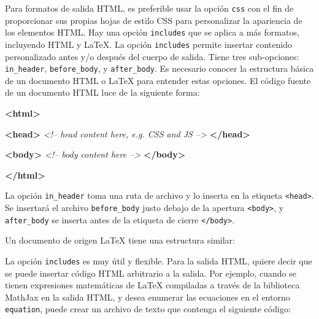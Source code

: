 \documentclass[12pt,]{krantz}
\makeatletter
\newenvironment{Shaded}{\begin{snugshade}}{\end{snugshade}}
\newcommand{\KeywordTok}[1]{\textcolor[rgb]{0.13,0.29,0.53}{\textbf{{#1}}}}
\newcommand{\CommentTok}[1]{\textcolor[rgb]{0.56,0.35,0.01}{\textit{{#1}}}}
\newcommand{\NormalTok}[1]{{#1}}
\newenvironment{kframe}{%
\medskip{}
\setlength{\fboxsep}{.8em}
 \def\at@end@of@kframe{}%
 \ifinner\ifhmode%
  \def\at@end@of@kframe{\end{minipage}}%
  \begin{minipage}{\columnwidth}%
 \fi\fi%
 \def\FrameCommand##1{\hskip\@totalleftmargin \hskip-\fboxsep
 \colorbox{shadecolor}{##1}\hskip-\fboxsep
     \hskip-\linewidth \hskip-\@totalleftmargin \hskip\columnwidth}%
 \MakeFramed {\advance\hsize-\width
   \@totalleftmargin\z@ \linewidth\hsize
   \@setminipage}}%
 {\par\unskip\endMakeFramed%
 \at@end@of@kframe}
\renewenvironment{Shaded}{\begin{kframe}}{\end{kframe}}
\theoremstyle{definition}
\theoremstyle{definition}
\theoremstyle{remark}
\makeatother
\begin{document}
Para formatos de salida HTML, es preferible usar la opción \texttt{css}
con el fin de proporcionar sus propias hojas de estilo CSS para
personalizar la apariencia de los elementos HTML. Hay una opción
\texttt{includes} que se aplica a más formatos, incluyendo HTML y LaTeX.
La opción \texttt{includes} permite insertar contenido personalizado
antes y/o después del cuerpo de salida. Tiene tres sub-opciones:
\texttt{in\_header}, \texttt{before\_body}, y \texttt{after\_body}. Es
necesario conocer la estructura básica de un documento HTML o LaTeX para
entender estas opciones. El código fuente de un documento HTML luce de
la siguiente forma:

\begin{Shaded}
\begin{Highlighting}[]
\KeywordTok{<html>}
  
  \KeywordTok{<head>}
  \CommentTok{<!-- head content here, e.g. CSS and JS -->}
  \KeywordTok{</head>}
  
  \KeywordTok{<body>}
  \CommentTok{<!-- body content here -->}
  \KeywordTok{</body>}

\KeywordTok{</html>}
\end{Highlighting}
\end{Shaded}

La opción \texttt{in\_header} toma una ruta de archivo y lo inserta en
la etiqueta \texttt{\textless{}head\textgreater{}}. Se insertará el
archivo \texttt{before\_body} justo debajo de la apertura
\texttt{\textless{}body\textgreater{}}, y \texttt{after\_body} se
inserta antes de la etiqueta de cierre
\texttt{\textless{}/body\textgreater{}}.

Un documento de origen LaTeX tiene una estructura similar:

\begin{Shaded}
\end{Shaded}

La opción \texttt{includes} es muy útil y flexible. Para la salida HTML,
quiere decir que se puede insertar código HTML arbitrario a la salida.
Por ejemplo, cuando se tienen expresiones matemáticas de LaTeX
compiladas a través de la biblioteca MathJax en la salida HTML, y desea
enumerar las ecuaciones en el entorno \texttt{equation}, puede crear un
archivo de texto que contenga el siguiente código:
\end{document}
